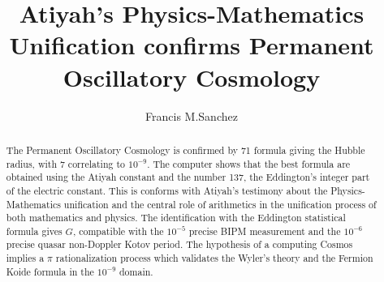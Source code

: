 \documentclass[preprint,12pt]{elsarticle}
\begin{document}
\begin{frontmatter}




\title{Atiyah's Physics-Mathematics Unification confirms Permanent Oscillatory Cosmology}



\author[mysecondaryaddress]{Francis M.Sanchez}

\address[mymainaddress]{Universite Paris Sud Orsay}

\begin{abstract}
The Permanent Oscillatory Cosmology is confirmed by 71 formula giving the Hubble radius, with 7 correlating to $10^{-9}$. The computer shows that the best formula are obtained using the Atiyah constant and the number 137, the Eddington's integer part of the electric constant. This is conforms with Atiyah's testimony about the Physics-Mathematics unification and the central role of arithmetics in the unification process of both mathematics and physics. The identification with the Eddington statistical formula gives $G$, compatible with the $10^{-5}$ precise BIPM measurement and the $10^{-6}$ precise quasar non-Doppler Kotov period. The hypothesis of a computing Cosmos implies a $\pi$ rationalization process which validates the Wyler's theory and the Fermion Koide formula in the $10^{-9}$ domain. 
\end{abstract}


\end{frontmatter}
\end{document}

